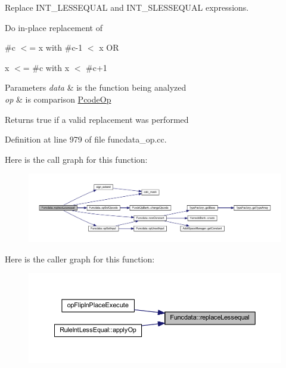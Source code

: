 Replace I\+N\+T\+\_\+\+L\+E\+S\+S\+E\+Q\+U\+AL and I\+N\+T\+\_\+\+S\+L\+E\+S\+S\+E\+Q\+U\+AL expressions. 

Do in-\/place replacement of
\begin{DoxyItemize}
\item {\ttfamily \#c $<$= x} with {\ttfamily \#c-\/1 $<$ x} OR
\item {\ttfamily x $<$= \#c} with {\ttfamily x $<$ \#c+1}
\end{DoxyItemize}


\begin{DoxyParams}{Parameters}
{\em data} & is the function being analyzed \\
\hline
{\em op} & is comparison \mbox{\hyperlink{class_pcode_op}{Pcode\+Op}} \\
\hline
\end{DoxyParams}
\begin{DoxyReturn}{Returns}
true if a valid replacement was performed 
\end{DoxyReturn}


Definition at line 979 of file funcdata\+\_\+op.\+cc.

Here is the call graph for this function\+:
\nopagebreak
\begin{figure}[H]
\begin{center}
\leavevmode
\includegraphics[width=350pt]{class_funcdata_a8af7249a90794ba6001046e28c0aeb5c_cgraph}
\end{center}
\end{figure}
Here is the caller graph for this function\+:
\nopagebreak
\begin{figure}[H]
\begin{center}
\leavevmode
\includegraphics[width=350pt]{class_funcdata_a8af7249a90794ba6001046e28c0aeb5c_icgraph}
\end{center}
\end{figure}
\mbox{\label{class_funcdata_a754fe8bd5805e6d9fd8041365e7747eb}} 
